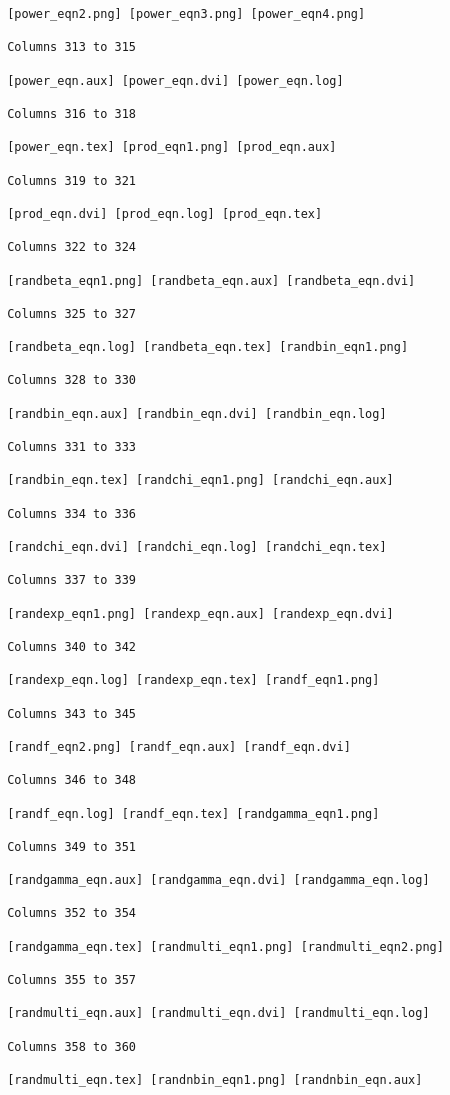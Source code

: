 \begin{verbatim}
 [power_eqn2.png] [power_eqn3.png] [power_eqn4.png] 

 Columns 313 to 315

 [power_eqn.aux] [power_eqn.dvi] [power_eqn.log] 

 Columns 316 to 318

 [power_eqn.tex] [prod_eqn1.png] [prod_eqn.aux] 

 Columns 319 to 321

 [prod_eqn.dvi] [prod_eqn.log] [prod_eqn.tex] 

 Columns 322 to 324

 [randbeta_eqn1.png] [randbeta_eqn.aux] [randbeta_eqn.dvi] 

 Columns 325 to 327

 [randbeta_eqn.log] [randbeta_eqn.tex] [randbin_eqn1.png] 

 Columns 328 to 330

 [randbin_eqn.aux] [randbin_eqn.dvi] [randbin_eqn.log] 

 Columns 331 to 333

 [randbin_eqn.tex] [randchi_eqn1.png] [randchi_eqn.aux] 

 Columns 334 to 336

 [randchi_eqn.dvi] [randchi_eqn.log] [randchi_eqn.tex] 

 Columns 337 to 339

 [randexp_eqn1.png] [randexp_eqn.aux] [randexp_eqn.dvi] 

 Columns 340 to 342

 [randexp_eqn.log] [randexp_eqn.tex] [randf_eqn1.png] 

 Columns 343 to 345

 [randf_eqn2.png] [randf_eqn.aux] [randf_eqn.dvi] 

 Columns 346 to 348

 [randf_eqn.log] [randf_eqn.tex] [randgamma_eqn1.png] 

 Columns 349 to 351

 [randgamma_eqn.aux] [randgamma_eqn.dvi] [randgamma_eqn.log] 

 Columns 352 to 354

 [randgamma_eqn.tex] [randmulti_eqn1.png] [randmulti_eqn2.png] 

 Columns 355 to 357

 [randmulti_eqn.aux] [randmulti_eqn.dvi] [randmulti_eqn.log] 

 Columns 358 to 360

 [randmulti_eqn.tex] [randnbin_eqn1.png] [randnbin_eqn.aux] 


\end{verbatim}
